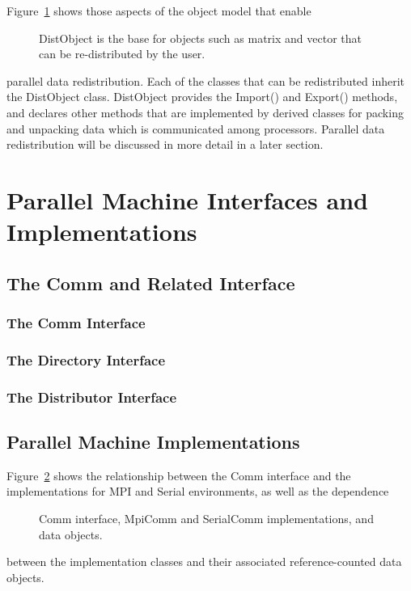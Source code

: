\documentclass[12pt,relax]{PetraObjectModel}
\begin{document}
Figure~\ref{distobj} shows those aspects of the object model that enable
\begin{figure}[ht]
\begin{center}
\caption{DistObject is the base for objects such as matrix and vector that can be re-distributed by the user.}
\label{distobj}
\end{center}
\end{figure}
parallel data redistribution. Each of the classes that can be redistributed
inherit the DistObject class. DistObject provides the Import() and Export()
methods, and declares other methods that are implemented by derived classes for
packing and unpacking data which is communicated among processors. Parallel
data redistribution will be discussed in more detail in a later section.

\section{Parallel Machine Interfaces and Implementations}

\subsection{The Comm and Related Interface}

\subsubsection{The Comm Interface}
\subsubsection{The Directory Interface}
\subsubsection{The Distributor Interface}

\subsection{Parallel Machine Implementations}
Figure~\ref{commfigure} shows the relationship between the Comm interface and
the implementations for MPI and Serial environments, as well as the dependence
\begin{figure}[ht]
\begin{center}
\caption{Comm interface, MpiComm and SerialComm implementations, and data objects.}
\label{commfigure}
\end{center}
\end{figure}
between the implementation classes and their associated reference-counted
data objects.
\end{document}
